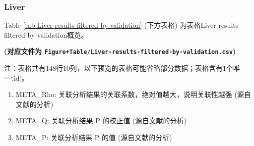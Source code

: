 \documentclass[
]{article}
\providecommand{\tightlist}{%
  \setlength{\itemsep}{0pt}\setlength{\parskip}{0pt}}
\begin{document}
\hypertarget{liver-1}{%
\subsubsection{Liver}\label{liver-1}}

Table \ref{tab:Liver-results-filtered-by-validation} (下方表格) 为表格Liver results filtered by validation概览。

\textbf{(对应文件为 \texttt{Figure+Table/Liver-results-filtered-by-validation.csv})}

\begin{center}\begin{tcolorbox}[colback=gray!10, colframe=gray!50, width=0.9\linewidth, arc=1mm, boxrule=0.5pt]注：表格共有148行10列，以下预览的表格可能省略部分数据；表格含有1个唯一`.id'。
\end{tcolorbox}
\end{center}
\begin{center}\begin{tcolorbox}[colback=gray!10, colframe=gray!50, width=0.9\linewidth, arc=1mm, boxrule=0.5pt]\begin{enumerate}\tightlist
\item META\_Rho:  关联分析结果的关联系数，绝对值越大，说明关联性越强 (源自文献的分析)
\item META\_Q:  关联分析结果 P 的校正值 (源自文献的分析)
\item META\_P:  关联分析结果 P 的值 (源自文献的分析)
\end{enumerate}\end{tcolorbox}
\end{center}
\end{document}
